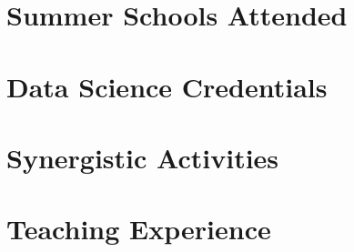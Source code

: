 \documentclass[margin,line]{resume}
\begin{document}
\begin{resume}
\vspace{-2mm}    
    \section{\mysidestyle Summer Schools Attended}

    

\vspace{-2mm}    
    \section{\mysidestyle Data Science Credentials}

    





    
    \section{\mysidestyle Synergistic Activities}

    



    \newpage
    \section{\mysidestyle Teaching Experience}
    
     
    \newpage


\end{resume}
\end{document}
